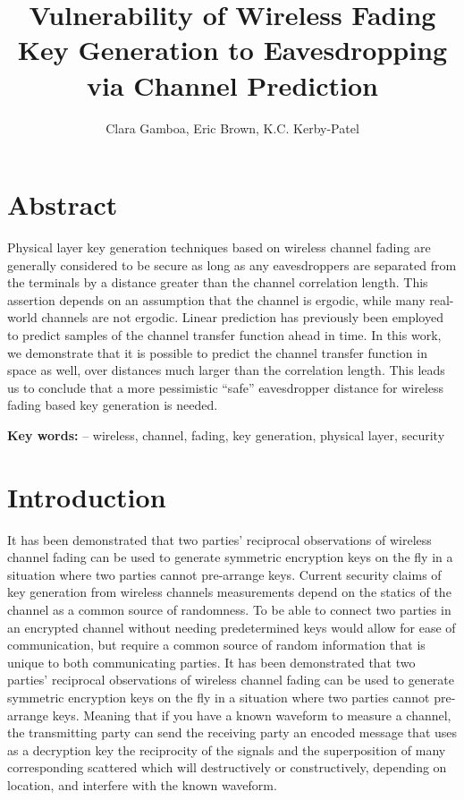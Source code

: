 \documentclass[11pt]{article} %
\title{Vulnerability of Wireless Fading Key Generation to Eavesdropping via Channel Prediction} %
\author{Clara Gamboa, Eric Brown, K.C. Kerby-Patel}  %
\begin{document}
\maketitle


\section{Abstract}

Physical layer key generation techniques based on wireless channel fading are generally considered to be secure as long as any eavesdroppers are separated from the terminals by a distance greater than the channel correlation length.  This assertion depends on an assumption that the channel is ergodic, while many real-world channels are not ergodic.  Linear prediction has previously been employed to predict samples of the channel transfer function ahead in time.  In this work, we demonstrate that it is possible to predict the channel transfer function in space as well, over distances much larger than the correlation length.  %
This leads us to conclude that a more pessimistic ``safe'' eavesdropper distance for wireless fading based key generation is needed.

\textbf{Key words:} -- wireless, channel, fading, key generation, physical layer, security

\section{Introduction}
It has been demonstrated \cite{azimisadjadi2007, bloch2008, mathur2008, ye2010} that two parties' reciprocal observations of wireless channel fading can be used to generate symmetric encryption keys on the fly in a situation where two parties cannot pre-arrange keys.  
\bigskip
Current security claims of key generation from wireless channels measurements depend on the statics of the channel as a common source of randomness. To be able to connect two parties in an encrypted channel without needing predetermined keys would allow for ease of communication, but require a common source of random information that is unique to both communicating parties. It has been demonstrated \cite{azimisadjadi2007, bloch2008, mathur2008, ye2010} that two parties' reciprocal observations of wireless channel fading can be used to generate symmetric encryption keys on the fly in a situation where two parties cannot pre-arrange keys.  Meaning that if you have a known waveform to measure a channel, the transmitting party can send the receiving party an encoded message that uses as a decryption key the reciprocity of the signals and the superposition of many corresponding scattered which will destructively or constructively, depending on location, and interfere with the known waveform.
\end{document}
